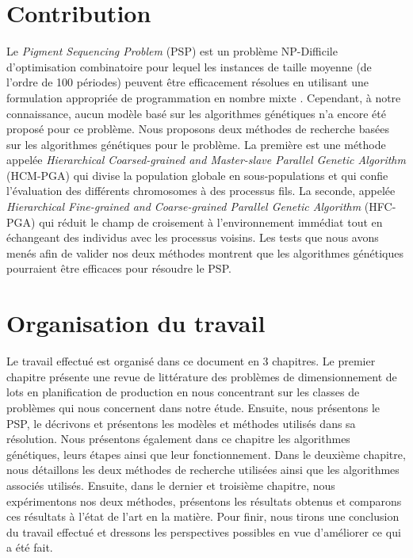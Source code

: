 	\section*{Contribution}
	Le \emph{Pigment Sequencing Problem} (PSP) est un problème NP-Difficile d'optimisation combinatoire pour lequel les instances de taille moyenne (de l'ordre de 100 périodes) peuvent être efficacement résolues en utilisant une formulation appropriée de programmation en nombre mixte \cite{pochet_wolsey}. Cependant, à notre connaissance, aucun modèle basé sur les algorithmes génétiques n'a encore été proposé pour ce problème. Nous proposons deux méthodes de recherche basées sur les algorithmes génétiques pour le problème. La première est une méthode appelée \emph{Hierarchical Coarsed-grained and Master-slave Parallel Genetic Algorithm} (HCM-PGA) qui divise la population globale en sous-populations et qui confie l'évaluation des différents chromosomes à des processus fils. La seconde, appelée \emph{Hierarchical Fine-grained and Coarse-grained Parallel Genetic Algorithm} (HFC-PGA) qui réduit le champ de croisement à l'environnement immédiat tout en échangeant des individus avec les processus voisins. Les tests que nous avons menés afin de valider nos deux méthodes montrent que les algorithmes génétiques pourraient être efficaces pour résoudre le PSP. 
	 
	\section*{Organisation du travail}

	Le travail effectué est organisé dans ce document en 3 chapitres. Le premier chapitre présente une revue de littérature des problèmes de dimensionnement de lots en planification de production en nous concentrant sur les classes de problèmes qui nous concernent dans notre étude. Ensuite, nous présentons le PSP, le décrivons et présentons les modèles et méthodes utilisés dans sa résolution. Nous présentons également dans ce chapitre les algorithmes génétiques, leurs étapes ainsi que leur fonctionnement. Dans le deuxième chapitre, nous détaillons les deux méthodes de recherche utilisées ainsi que les algorithmes associés utilisés. Ensuite, dans le dernier et troisième chapitre, nous expérimentons  nos deux méthodes, présentons les résultats obtenus et comparons ces résultats à l'état de l'art en la matière. Pour finir, nous tirons une conclusion du travail effectué et dressons les perspectives possibles en vue d'améliorer ce qui a été fait.